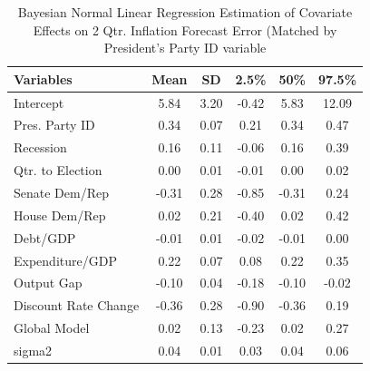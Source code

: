 \documentclass[a4paper]{article}\usepackage{graphicx, color}
\begin{document}


\begin{table}[ht]
\begin{center}
\caption{Bayesian Normal Linear Regression Estimation of Covariate Effects on 2 Qtr. Inflation Forecast Error (Matched by President's Party ID variable}
\label{OutputPB}
{\small
\begin{tabular}{lccccc}
  \hline
Variables & Mean & SD & 2.5\% & 50\% & 97.5\% \\ 
  \hline
Intercept & 5.84 & 3.20 & -0.42 & 5.83 & 12.09 \\ 
  Pres. Party ID & 0.34 & 0.07 & 0.21 & 0.34 & 0.47 \\ 
  Recession & 0.16 & 0.11 & -0.06 & 0.16 & 0.39 \\ 
  Qtr. to Election & 0.00 & 0.01 & -0.01 & 0.00 & 0.02 \\ 
  Senate Dem/Rep & -0.31 & 0.28 & -0.85 & -0.31 & 0.24 \\ 
  House Dem/Rep & 0.02 & 0.21 & -0.40 & 0.02 & 0.42 \\ 
  Debt/GDP & -0.01 & 0.01 & -0.02 & -0.01 & 0.00 \\ 
  Expenditure/GDP & 0.22 & 0.07 & 0.08 & 0.22 & 0.35 \\ 
  Output Gap & -0.10 & 0.04 & -0.18 & -0.10 & -0.02 \\ 
  Discount Rate Change & -0.36 & 0.28 & -0.90 & -0.36 & 0.19 \\ 
  Global Model & 0.02 & 0.13 & -0.23 & 0.02 & 0.27 \\ 
  sigma2 & 0.04 & 0.01 & 0.03 & 0.04 & 0.06 \\ 
   \hline
\end{tabular}
}
\end{center}
\end{table}





\clearpage



\end{document}

